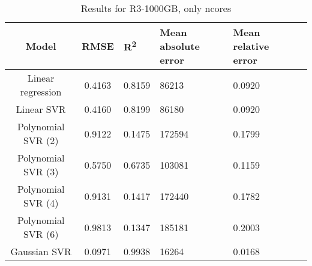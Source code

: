 \begin{table}[H]
\centering
\begin{adjustbox}{center}
\begin{tabular}{c | c M{1.2cm} M{2.5cm} M{2.5cm} M{1.8cm}}
Model & RMSE & R\textsuperscript{2} & Mean absolute error & Mean relative error \tabularnewline
\hline
Linear regression & 0.4163 & 0.8159 &  86213 & 0.0920 \\
Linear SVR & 0.4160 & 0.8199 &  86180 & 0.0920 \\
Polynomial SVR (2) & 0.9122 & 0.1475 & 172594 & 0.1799 \\
Polynomial SVR (3) & 0.5750 & 0.6735 & 103081 & 0.1159 \\
Polynomial SVR (4) & 0.9131 & 0.1417 & 172440 & 0.1782 \\
Polynomial SVR (6) & 0.9813 & 0.1347 & 185181 & 0.2003 \\
Gaussian SVR & 0.0971 & 0.9938 &  16264 & 0.0168 \\
\end{tabular}
\end{adjustbox}
\\
\caption{Results for R3-1000GB, only ncores}
\label{tab:only_1_linear_R3_1000}
\end{table}
